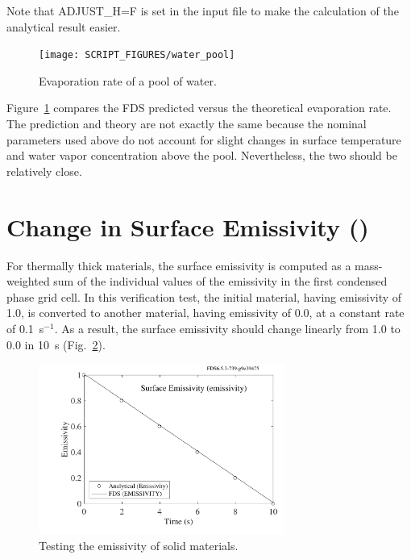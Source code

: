 \documentclass[11pt]{book}
\begin{document}
Note that {\ct ADJUST\_H=F} is set in the input file to make the calculation of the analytical result easier.

\begin{figure}[!ht]
\centering
\texttt{[image: SCRIPT\_FIGURES/water\_pool]}
\caption[The  test case]{Evaporation rate of a pool of water.}
\label{water_pool_fig}
\end{figure}

Figure~\ref{water_pool_fig} compares the FDS predicted versus the theoretical evaporation rate. The prediction and theory are not exactly the same because the nominal parameters used above do not account for slight changes in surface temperature and water vapor concentration above the pool. Nevertheless, the two should be relatively close.

\FloatBarrier


\section{Change in Surface Emissivity (\texorpdfstring{}{emissivity})}

For thermally thick materials, the surface emissivity is computed as a mass-weighted sum of the individual values of the emissivity in the first condensed phase grid cell. In this verification test, the initial material, having emissivity of 1.0, is converted to another material, having emissivity of 0.0, at a constant rate of 0.1~s$^{-1}$. As a result, the surface emissivity should change linearly from 1.0 to 0.0 in 10~s (Fig.~\ref{emissivity}).

\begin{figure}[!htb]
\centering
\includegraphics[height=2.2in]{SCRIPT_FIGURES/emissivity}
\caption[The  test case]{Testing the emissivity of solid materials.}
\label{emissivity}
\end{figure}
\end{document}
